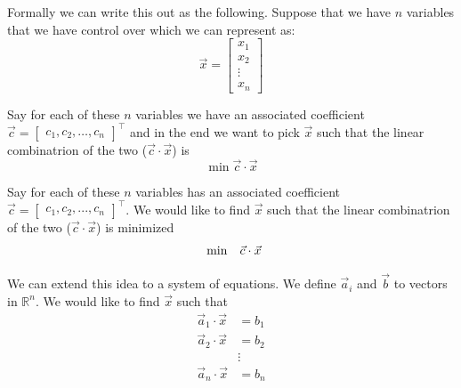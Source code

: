 \documentclass{article}
\begin{document}
Formally we can write this out as the following. Suppose that we have \( n \) variables that we have control over which we can represent as:
\[
\vec{x} = \begin{bmatrix} x_1 \\ x_2 \\ \vdots \\ x_n \end{bmatrix}
\]

Say for each of these \( n \) variables we have an associated coefficient \( \vec{c} = \begin{bmatrix} c_1, c_2, \ldots, c_n  \end{bmatrix}^\top \) and in the end we want to pick \( \vec{x} \) such that the linear combinatrion of the two (\( \vec{c} \cdot \vec{x} \)) is
\[
\min \vec{c} \cdot \vec{x}
\]

Say for each of these \( n \) variables has an associated coefficient \( \vec{c} = \begin{bmatrix} c_1, c_2, ..., c_n  \end{bmatrix}^\top \).
We would like to find \( \vec{x} \) such that the linear combinatrion of the two (\( \vec{c} \cdot \vec{x} \)) is minimized
\begin{align*}
  \begin{array}{ll@{}ll}
  \min  & \vec{c} \cdot \vec{x}
  \end{array}
\end{align*}

We can extend this idea to a system of equations. We define \( \vec{a}_i \) and \( \vec{b} \) to vectors in $\mathbb{R}^n$. We would like to find \( \vec{x} \) such that
\begin{align*}
\vec{a}_1 \cdot \vec{x} &= b_1 \\
\vec{a}_2 \cdot \vec{x} &= b_2 \\
& \vdots  \\
\vec{a}_n \cdot \vec{x} &= b_n \\
\end{align*}
\end{document}
